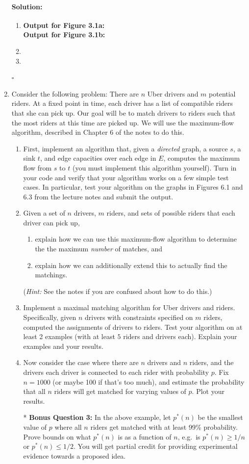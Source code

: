 \documentclass[11pt,letterpaper]{article}
\newif \iftemplate \templatetrue
\newenvironment{solution}{\paragraph{Solution:}}{\hfill$\square$}
\theoremstyle{definition}
\begin{document}
\begin{enumerate}
\iftemplate
\begin{solution}
\begin{enumerate}[label=(\alph*)]
\item \textbf{Output for Figure 3.1a:} \\
\textbf{Output for Figure 3.1b:}
\item 
\item
\end{enumerate}
\end{solution}
\newpage
\fi

\item Consider the following problem: There are $n$ Uber drivers and $m$ potential riders. At a fixed point in time, each driver has a list of compatible riders that she can pick up. Our goal will be to match drivers to riders such that the most riders at this time are picked up. We will use the maximum-flow algorithm, described in Chapter 6 of the notes to do this.
\begin{enumerate}
\item First, implement an algorithm that, given a \emph{directed} graph, a source $s$, a sink $t$, and edge capacities over each edge in $E$, computes the maximum flow from $s$ to $t$ (you must implement this algorithm yourself). Turn in your code and verify that your algorithm works on a few simple test cases. In particular, test your algorithm on the graphs in Figures 6.1 and 6.3 from the lecture notes and submit the output. 
\item Given a set of $n$ drivers, $m$ riders, and sets of possible riders that each driver can pick up, 
\begin{enumerate}
\item explain how we can use this maximum-flow algorithm to determine the the maximum \emph{number} of matches, and
\item explain how we can additionally extend this to actually find the matchings.
\end{enumerate}
(\emph{Hint:} See the notes if you are confused about how to do this.)
\item Implement a maximal matching algorithm for Uber drivers and riders. Specifically, given $n$ drivers with constraints specified on $m$ riders, computed the assignments of drivers to riders. Test your algorithm on at least 2 examples (with at least $5$ riders and drivers each). Explain your examples and your results.
\item Now consider the case where there are $n$ drivers and $n$ riders, and the drivers each driver is connected to each rider with probability $p$. Fix $n = 1000$ (or maybe 100 if that's too much), and estimate the probability that all $n$ riders will get matched for varying values of $p$. Plot your results.
\item[*] \textbf{Bonus Question 3:} In the above example, let $p^*(n)$ be the smallest value of $p$ where all $n$ riders get matched with at least 99\% probability. Prove bounds on what $p^*(n)$ is as a function of $n$, e.g.\ is $p^*(n) \ge 1/n$ or $p^*(n) \le 1/2$. You will get partial credit for providing experimental evidence towards a proposed idea.
\end{enumerate}


\end{enumerate}
\end{document}
